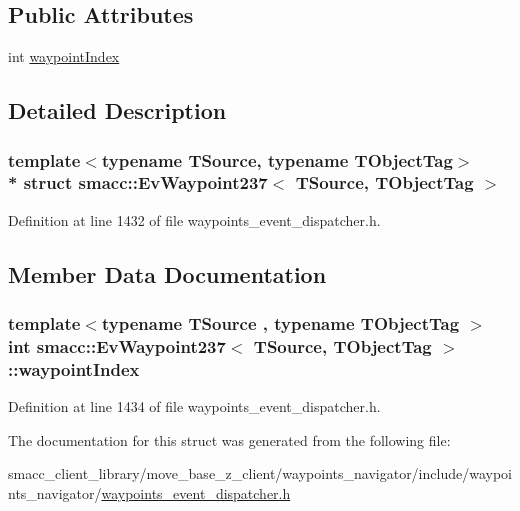 \subsection*{Public Attributes}
\begin{DoxyCompactItemize}
\item 
int \hyperlink{structsmacc_1_1EvWaypoint237_af9ced0ca36923357fbf0ab5f4be39c7f}{waypoint\+Index}
\end{DoxyCompactItemize}


\subsection{Detailed Description}
\subsubsection*{template$<$typename T\+Source, typename T\+Object\+Tag$>$\\*
struct smacc\+::\+Ev\+Waypoint237$<$ T\+Source, T\+Object\+Tag $>$}



Definition at line 1432 of file waypoints\+\_\+event\+\_\+dispatcher.\+h.



\subsection{Member Data Documentation}
\subsubsection[{\texorpdfstring{waypoint\+Index}{waypointIndex}}]{\setlength{\rightskip}{0pt plus 5cm}template$<$typename T\+Source , typename T\+Object\+Tag $>$ int {\bf smacc\+::\+Ev\+Waypoint237}$<$ T\+Source, T\+Object\+Tag $>$\+::waypoint\+Index}\hypertarget{structsmacc_1_1EvWaypoint237_af9ced0ca36923357fbf0ab5f4be39c7f}{}\label{structsmacc_1_1EvWaypoint237_af9ced0ca36923357fbf0ab5f4be39c7f}


Definition at line 1434 of file waypoints\+\_\+event\+\_\+dispatcher.\+h.



The documentation for this struct was generated from the following file\+:\begin{DoxyCompactItemize}
\item 
smacc\+\_\+client\+\_\+library/move\+\_\+base\+\_\+z\+\_\+client/waypoints\+\_\+navigator/include/waypoints\+\_\+navigator/\hyperlink{waypoints__event__dispatcher_8h}{waypoints\+\_\+event\+\_\+dispatcher.\+h}\end{DoxyCompactItemize}
